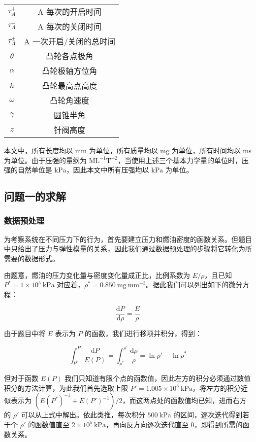 \documentclass[18pt]{ctexart}
\newcommand{\prb}{\times 10^5~\mathrm{kPa}}
\newcommand{\pre}{~\mathrm{kPa}}
\newcommand{\den}{~\mathrm{mg~mm^{-3}}}
\begin{document}
\begin{table}[!ht]
\begin{minipage}{\textwidth}
\begin{minipage}[t]{0.5\textwidth}
\begin{tabular}{cc}
        $\tau_A^+$     & A 每次的开启时间     \\
        $\tau_A^-$     & A 每次的关闭时间     \\
        $\tau_A^{\pm}$ & A 一次开启/关闭的总时间 \\
        $\theta$       & 凸轮各点极角        \\
        $\alpha$       & 凸轮极轴方位角       \\
        $h$            & 凸轮最高点高度       \\
        $\omega$       & 凸轮角速度         \\
        $\gamma$       & 圆锥半角          \\
        $z$            & 针阀高度          \\ \bottomrule
        \end{tabular}
        \end{minipage}
    \end{minipage}
\end{table}

本文中，所有长度均以 $\mathrm{mm}$ 为单位，所有质量均以 $\mathrm{mg}$ 为单位，所有时间均以 $\mathrm{ms}$ 为单位。由于压强的量纲为 $\mathrm{ML^{-1}T^{-2}}$，当使用上述三个基本力学量的单位时，压强的自然单位是 $\mathrm{kPa}$，因此本文中所有压强均以 $\mathrm{kPa}$ 为单位。

\subsection{问题一的求解}

\subsubsection{数据预处理}

为考察系统在不同压力下的行为，首先要建立压力和燃油密度的函数关系。但题目中只给出了压力与弹性模量的关系，因此我们通过数据预处理的步骤将它转化为所需要的数据形式。

由题意，燃油的压力变化量与密度变化量成正比，比例系数为 $E/\rho$，且已知 $P^*=1\prb$ 对应着，$\rho^* = 0.850\den$。据此我们可以列出如下的微分方程：

$$
\frac{\mathrm dP}{\mathrm d\rho}=\frac{E}{\rho}
$$

由于题目中将 $E$ 表示为 $P$ 的函数，我们进行移项并积分，得到：

$$
\int_{P^*}^{P'}\frac{\mathrm dP}{E(P)}=\int_{\rho^*}^{\rho'}\frac{\mathrm d\rho}{\rho}=\ln\rho'-\ln\rho^*
$$

但对于函数 $E(P)$ 我们只知道有限个点的函数值，因此左方的积分必须通过数值积分的方法计算，为此我们首先选取上限 $P' = 1.005\prb$，将左方的积分近似表示为 $(E(P^*)^{-1}+E(P')^{-1})/2$，而这两点处的函数值均已知，进而右方的 $\rho'$ 可以从上式中解出。依此类推，每次积分 $500\pre$ 的区间，逐次迭代得到若干个 $\rho'$ 的函数值直至 $2\prb$，再向反方向逐次迭代直至 $0$，即得到所需的函数关系。
\end{document}

